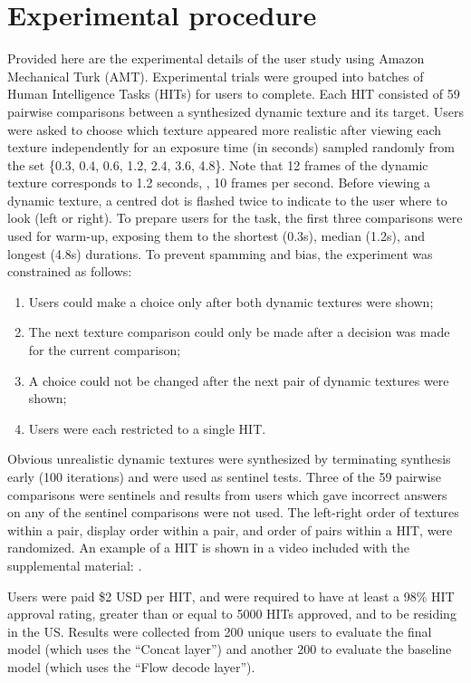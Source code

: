 \section{Experimental procedure}
Provided here are the experimental details of the user study
using Amazon Mechanical Turk (AMT). Experimental trials were
grouped into batches of Human Intelligence Tasks (HITs) for
users to complete. Each HIT consisted of 59 pairwise
comparisons between a synthesized dynamic texture and its target.
Users were asked to choose which texture appeared more realistic
after viewing each texture independently for an exposure time (in seconds) 
sampled randomly from the set \{0.3, 0.4, 0.6, 1.2, 2.4, 3.6, 4.8\}.
Note that 12 frames of the dynamic texture corresponds to 1.2 seconds, \ie, 10 frames per second.
Before viewing a dynamic texture, a centred dot is flashed twice to
indicate to the user where to look (left or right).
To prepare users for the task, the first three comparisons 
were used for warm-up, exposing them to the shortest (0.3s), 
median (1.2s), and longest (4.8s) durations.
To prevent spamming and bias, the experiment was constrained as 
follows:
\begin{enumerate}
	\item Users could make a choice only after both dynamic textures were shown;
	\item The next texture comparison could only be made after a decision was made for the current comparison;
	\item A choice could not be changed after the next pair of dynamic textures were shown;
	\item Users were each restricted to a single HIT.
\end{enumerate}
Obvious unrealistic dynamic textures were synthesized by 
terminating synthesis early (100 iterations) and were used as sentinel tests. 
Three of the 59 pairwise comparisons were sentinels and results from
users which gave incorrect answers on any of the sentinel
comparisons were not used. The left-right order of textures within a pair,
display order within a pair, and order of pairs within a HIT, were randomized.
An example of a HIT is shown in a video included with the supplemental material: .

Users were paid \$2 USD per HIT, and were required to have at least
a 98\% HIT approval rating, greater than or equal to 5000 HITs
approved, and to be residing in the US. Results were collected from 200 unique 
users to evaluate the final model (which uses the ``Concat layer'') and another 200 to evaluate the baseline model (which uses the ``Flow decode layer'').